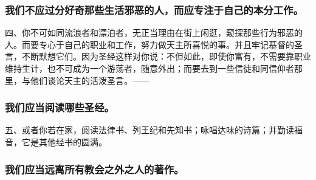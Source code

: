 
\subsubsection{我们不应过分好奇那些生活邪恶的人，而应专注于自己的本分工作。}

四、你不可如同流浪者和漂泊者，无正当理由在街上闲逛，窥探那些行为邪恶的人。而要专心于自己的职业和工作，努力做天主所喜悦的事。并且牢记基督的圣言，不断默想它们。因为圣经这样对你说：不但如此，即使你富有，不需要靠职业维持生计，也不可成为一个游荡者，随意外出；而要去到一些信徒和同信仰者那里，与他们谈论天主的活泼圣言。——\par


\subsubsection{我们应当阅读哪些圣经。}

五、或者你若在家，阅读法律书、列王纪和先知书；咏唱达味的诗篇；并勤读福音，它是其他经书的圆满。\par


\subsubsection{我们应当远离所有教会之外之人的著作。}

